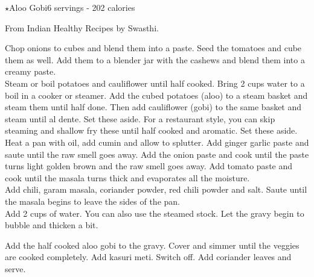 \begin{recipe}{$\star$Aloo Gobi}{6 servings - 202 calories}{}

\freeform From Indian Healthy Recipes by Swasthi.


Chop onions to cubes and blend them into a paste. Seed the tomatoes and cube them as well. Add them to a blender jar with the cashews and
blend them into a creamy paste.\\

Steam or boil potatoes and cauliflower until half cooked. Bring 2 cups water to a boil in a cooker or steamer. Add the cubed potatoes (aloo) to a steam basket and steam them until half done. Then add cauliflower (gobi) to the same basket and steam until al dente. Set these aside. For a restaurant style, you can skip steaming and shallow fry these until half cooked and aromatic. Set these aside.\\

Heat a pan with oil, add cumin and allow to splutter. Add ginger garlic paste and saute until the raw smell goes away. Add the onion paste and cook until the paste turns light golden brown and the raw smell goes away. Add tomato paste and cook until the masala turns thick and evaporates all the moisture.\\

Add chili, garam masala, coriander powder, red chili powder and salt. Saute until the masala begins to leave the sides of the pan.\\

Add 2  cups of water. You can also use the steamed stock. Let the gravy begin to bubble and thicken a bit.

Add the half cooked aloo gobi to the gravy. Cover and simmer until the veggies are cooked completely. Add kasuri meti. Switch off. Add coriander leaves and serve.

\end{recipe}